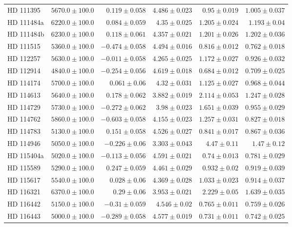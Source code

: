 \begin{longtable*}{lrrrrr}
HD 111395 & $5670.0\pm 100.0$ & $0.119\pm 0.058$ & $4.486\pm 0.023$ & $0.95\pm 0.019$ & $1.005\pm 0.037$ \\ 
HD 111484a & $6220.0\pm 100.0$ & $0.084\pm 0.059$ & $4.35\pm 0.025$ & $1.205\pm 0.024$ & $1.193\pm 0.04$ \\ 
HD 111484b & $6230.0\pm 100.0$ & $0.118\pm 0.061$ & $4.357\pm 0.021$ & $1.201\pm 0.026$ & $1.202\pm 0.036$ \\ 
HD 111515 & $5360.0\pm 100.0$ & $-0.474\pm 0.058$ & $4.494\pm 0.016$ & $0.816\pm 0.012$ & $0.762\pm 0.018$ \\ 
HD 112257 & $5630.0\pm 100.0$ & $-0.011\pm 0.058$ & $4.265\pm 0.025$ & $1.172\pm 0.027$ & $0.926\pm 0.032$ \\ 
HD 112914 & $4840.0\pm 100.0$ & $-0.254\pm 0.056$ & $4.619\pm 0.018$ & $0.684\pm 0.012$ & $0.709\pm 0.025$ \\ 
HD 114174 & $5700.0\pm 100.0$ & $0.061\pm 0.06$ & $4.32\pm 0.031$ & $1.125\pm 0.027$ & $0.968\pm 0.044$ \\ 
HD 114613 & $5640.0\pm 100.0$ & $0.178\pm 0.062$ & $3.882\pm 0.019$ & $2.114\pm 0.053$ & $1.247\pm 0.028$ \\ 
HD 114729 & $5730.0\pm 100.0$ & $-0.272\pm 0.062$ & $3.98\pm 0.023$ & $1.651\pm 0.039$ & $0.955\pm 0.029$ \\ 
HD 114762 & $5860.0\pm 100.0$ & $-0.603\pm 0.058$ & $4.155\pm 0.023$ & $1.257\pm 0.031$ & $0.827\pm 0.018$ \\ 
HD 114783 & $5130.0\pm 100.0$ & $0.151\pm 0.058$ & $4.526\pm 0.027$ & $0.841\pm 0.017$ & $0.867\pm 0.036$ \\ 
HD 114946 & $5050.0\pm 100.0$ & $-0.226\pm 0.06$ & $3.303\pm 0.043$ & $4.47\pm 0.11$ & $1.47\pm 0.12$ \\ 
HD 115404a & $5020.0\pm 100.0$ & $-0.113\pm 0.056$ & $4.591\pm 0.021$ & $0.74\pm 0.013$ & $0.781\pm 0.029$ \\ 
HD 115589 & $5290.0\pm 100.0$ & $0.247\pm 0.059$ & $4.461\pm 0.029$ & $0.932\pm 0.02$ & $0.919\pm 0.039$ \\ 
HD 115617 & $5540.0\pm 100.0$ & $0.028\pm 0.06$ & $4.369\pm 0.028$ & $1.033\pm 0.023$ & $0.914\pm 0.037$ \\ 
HD 116321 & $6370.0\pm 100.0$ & $0.29\pm 0.06$ & $3.953\pm 0.021$ & $2.229\pm 0.05$ & $1.639\pm 0.035$ \\ 
HD 116442 & $5150.0\pm 100.0$ & $-0.31\pm 0.059$ & $4.546\pm 0.02$ & $0.765\pm 0.011$ & $0.759\pm 0.026$ \\ 
HD 116443 & $5000.0\pm 100.0$ & $-0.289\pm 0.058$ & $4.577\pm 0.019$ & $0.731\pm 0.011$ & $0.742\pm 0.025$ \\ 

\end{longtable*}
